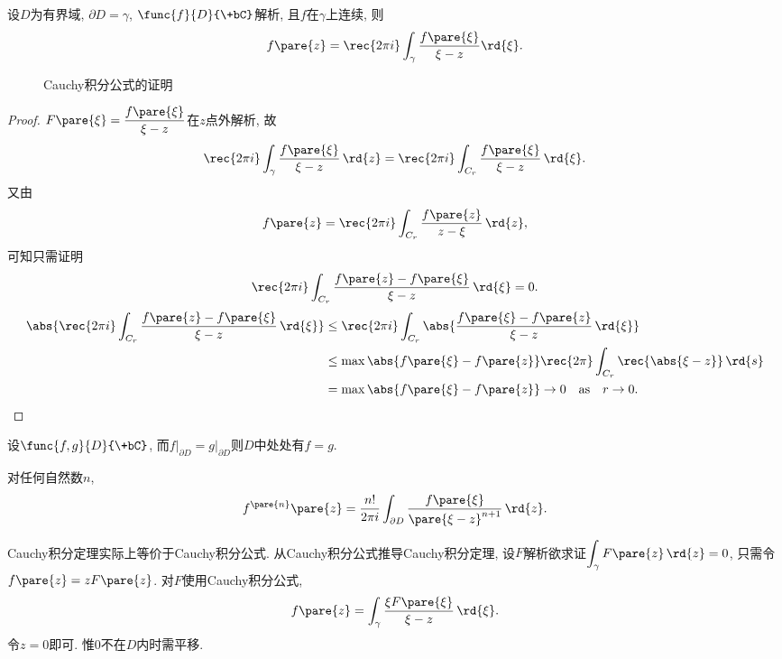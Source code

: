 \documentclass[../ComplexVariable.tex]{subfiles}
\begin{document}
\begin{finale}
    \begin{theorem}[Cauchy积分公式]
        设$D$为有界域, $\partial D = \gamma$, $\func{f}{D}{\+bC}$解析, 且$f$在$\gamma$上连续, 则
        \[ f\pare{z} = \rec{2\pi i} \int_\gamma \frac{f\pare{\xi}}{\xi - z} \rd{\xi}. \]
    \end{theorem}
\end{finale}
\begin{figure}[hb]
    \centering
    \caption{Cauchy积分公式的证明}
\end{figure}
\begin{proof}
    $\displaystyle F\pare{\xi} = \frac{f\pare{\xi}}{\xi - z}$在$z$点外解析, 故
    \[ \rec{2\pi i} \int_\gamma \frac{f\pare{\xi}}{\xi - z}\,\rd{z} = \rec{2\pi i}\int_{C_r} \frac{f\pare{\xi}}{\xi - z}\,\rd{\xi}. \]
    又由
    \[ f\pare{z} = \rec{2\pi i}\int_{C_r} \frac{f\pare{z}}{z - \xi}\,\rd{z}, \]
    可知只需证明
    \[ \rec{2\pi i} \int_{C_r} \frac{f\pare{z} - f\pare{\xi}}{\xi - z} \,\rd{\xi} = 0. \]
    \begin{align*}
        \abs{\rec{2\pi i} \int_{C_r} \frac{f\pare{z} - f\pare{\xi}}{\xi - z}\,\rd{\xi}} &\le \rec{2\pi i}\int_{C_r} \abs{\frac{f\pare{\xi} - f\pare{z}}{\xi - z}\,\rd{\xi}} \\
        &\le \max\abs{f\pare{\xi} - f\pare{z}} \rec{2\pi} \int_{C_r} {\rec{\abs{\xi - z}}}\,\rd{s} \\
        &= \max \abs{f\pare{\xi} - f\pare{z}} \rightarrow 0\quad \mathrm{as} \quad r\rightarrow 0. \qedhere
    \end{align*}
\end{proof}
\begin{remark}
    设$\func{f,g}{D}{\+bC}$, 而$f\vert_{\partial D} = g\vert_{\partial D}$则$D$中处处有$f=g$.
\end{remark}
\begin{theorem}[Cauchy积分公式求导]
    对任何自然数$n$,
    \[ f^{\pare{n}}\pare{z} = \frac{n!}{2\pi i}\int_{\partial D} \frac{f\pare{\xi}}{\pare{\xi - z}^{n+1}}\,\rd{z}. \]
\end{theorem}
\begin{remark}
    Cauchy积分定理实际上等价于Cauchy积分公式. 从Cauchy积分公式推导Cauchy积分定理, 设$F$解析欲求证$\displaystyle \int_\gamma F\pare{z}\,\rd{z} = 0$, 只需令$f\pare{z} = zF\pare{z}$. 对$F$使用Cauchy积分公式,
    \[ f\pare{z} = \int_\gamma \frac{\xi F\pare{\xi}}{\xi - z}\,\rd{\xi}. \]
    令$z=0$即可. 惟$0$不在$D$内时需平移.
\end{remark}
\end{document}
